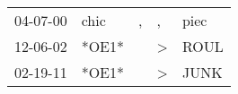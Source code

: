 \begin{supertabular}{lllll}
 04-07-00 &   chic &  , &             , &  piec \\
 12-06-02 &  *OE1* &    &  \textgreater &  ROUL \\
 02-19-11 &  *OE1* &    &  \textgreater &  JUNK \\
\end{supertabular}
